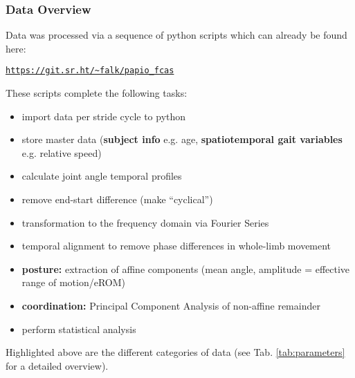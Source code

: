\subsubsection{Data Overview}
\label{intro:dataprep}
Data was processed via a sequence of python scripts which can already be found here: \begin{center}\href{https://git.sr.ht/\~falk/papio\_fcas}{\nolinkurl{https://git.sr.ht/~falk/papio_fcas}}\end{center}
These scripts complete the following tasks:
\begin{itemize}
\item import data per stride cycle to python
\item store master data (\textbf{subject info} e.g. age, \textbf{spatiotemporal gait variables} e.g. relative speed)
\item calculate joint angle temporal profiles
\item remove end-start difference (make ``cyclical'')
\item transformation to the frequency domain via Fourier Series
\item temporal alignment to remove phase differences in whole-limb movement
\item \textbf{posture:} extraction of affine components (mean angle, amplitude = effective range of motion/eROM)
\item \textbf{coordination:} Principal Component Analysis of non-affine remainder
\item perform statistical analysis
\end{itemize}


Highlighted above are the different categories of data (see Tab. \ref{tab:parameters} for a detailed overview).


